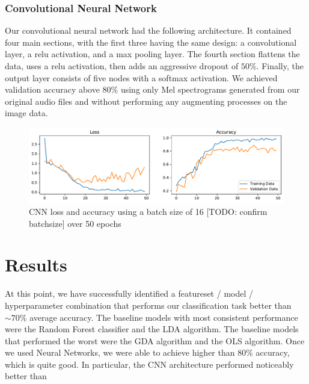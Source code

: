\documentclass[11pt]{article}
\begin{document}
\subsubsection{Convolutional Neural Network}
Our convolutional neural network had the following architecture.
It contained four main sections, with the first three having the same design: a convolutional layer, a relu activation, and a max pooling layer.
The fourth section flattens the data, uses a relu activation, then adds an aggressive dropout of $50 \%$.
Finally, the output layer consists of five nodes with a softmax activation. We achieved validation accuracy above 80\% using only Mel spectrograms generated from our original audio files and without performing any augmenting processes on the image data.
\begin{figure}[!htb]
\begin{center}
   \includegraphics[width=0.8\linewidth]{../cnn_models/first_try_loss_acc.pdf}
   \caption{CNN loss and accuracy using a batch size of 16 [TODO: confirm batchsize] over 50 epochs}
\end{center}
\end{figure}

\section{Results}
At this point, we have successfully identified a featureset / model / hyperparameter combination that performs our classification task better than $\sim70\%$ average accuracy.
The baseline models with most consistent performance were the Random Forest classifier and the LDA algorithm.
The baseline models that performed the worst were the GDA algorithm and the OLS algorithm.
Once we used Neural Networks, we were able to achieve higher than $ 80 \% $ accuracy, which is quite good. In particular, the CNN architecture performed noticeably better than 
\end{document}

